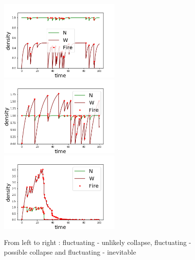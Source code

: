\documentclass{article}
\begin{document}
\begin{figure}[h!]
\centering
\includegraphics[width=6cm]{equivalent_low_never_2.png}
\includegraphics[width=6cm]{equivalent_low_never_3.png} \\
\includegraphics[width=6cm]{equivalent_low_between_2.png}
\caption{From left to right : fluctuating - unlikely collapse, fluctuating - possible collapse and fluctuating - inevitable}
\end{figure}






\end{document}
